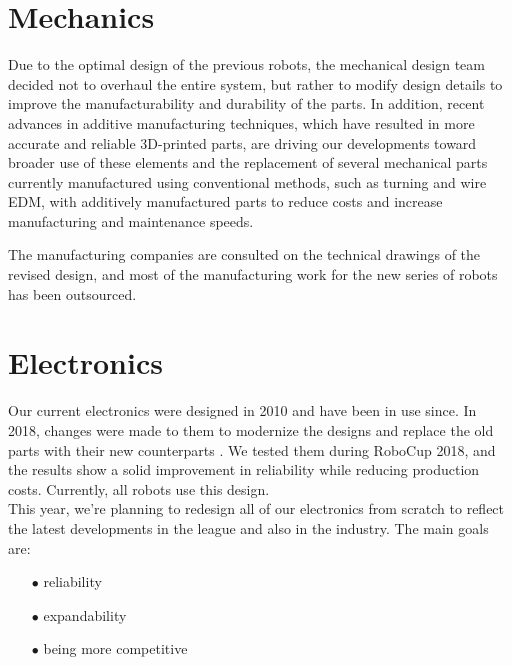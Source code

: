 \documentclass[runningheads]{llncs}
\begin{document}
\section {Mechanics}
Due to the optimal design of the previous robots, the mechanical design team decided not to overhaul the entire system, but rather to modify design details to improve the manufacturability and durability of the parts. In addition, recent advances in additive manufacturing techniques, which have resulted in more accurate and reliable 3D-printed parts, are driving our developments toward broader use of these elements and the replacement of several mechanical parts currently manufactured using conventional methods, such as turning and wire EDM, with additively manufactured parts to reduce costs and increase manufacturing and maintenance speeds.

The manufacturing companies are consulted on the technical drawings of the revised design, and most of the manufacturing work for the new series of robots has been outsourced.


\section{Electronics}

Our current electronics were designed in 2010 and have been in use since. In 2018, changes were made to them to modernize the designs and replace the old parts with their new counterparts \cite{ref_ETDP2018}. We tested them during RoboCup 2018, and the results show a solid improvement in reliability while reducing production costs. Currently, all robots use this design.\\
\indent This year, we're planning to redesign all of our electronics from scratch to reflect the latest developments in the league and also in the industry. The main goals are:

\begin{enumerate}
    \item[$\bullet$] reliability
    \item[$\bullet$] expandability
    \item[$\bullet$] being more competitive
\end{enumerate}
\end{document}

